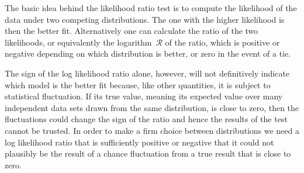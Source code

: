 \documentclass[final]{siamltex}
\begin{document}
The basic idea behind the likelihood ratio test is to compute the
likelihood of the data under two competing distributions.  The one with the
higher likelihood is then the better fit.  Alternatively one can calculate
the ratio of the two likelihoods, or equivalently the
logarithm~$\mathcal{R}$ of the ratio, which is positive or negative
depending on which distribution is better, or zero in the event of a
tie.

The sign of the log likelihood ratio alone, however, will not definitively
indicate which model is the better fit because, like other quantities, it
is subject to statistical fluctuation.  If its true value, meaning its
expected value over many independent data sets drawn from the same
distribution, is close to zero, then the fluctuations could change the sign
of the ratio and hence the results of the test cannot be trusted.  In order
to make a firm choice between distributions we need a log likelihood ratio
that is sufficiently positive or negative that it could not plausibly be
the result of a chance fluctuation from a true result that is close to
zero.
\end{document}
